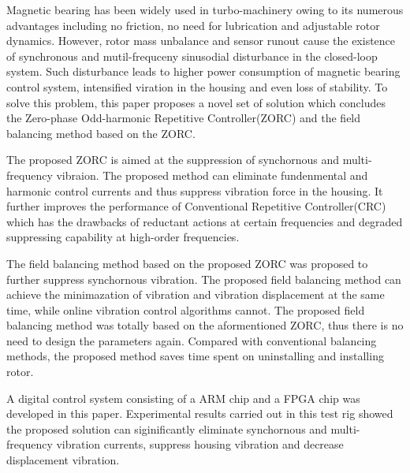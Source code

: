\begin{abstractEn}
Magnetic bearing has been widely used in turbo-machinery owing to its numerous advantages including no friction, no need for lubrication and adjustable rotor dynamics. However, rotor mass unbalance and sensor runout cause the existence of synchronous and mutil-frequceny sinusodial disturbance in the closed-loop system. Such disturbance leads to higher power consumption of magnetic bearing control system, intensified viration in the housing and even loss of stability. To solve this problem, this paper proposes a novel set of solution which concludes the Zero-phase Odd-harmonic Repetitive Controller(ZORC) and the field balancing method based on the ZORC. 

The proposed ZORC is aimed at the suppression of synchornous and multi-frequency vibraion. The proposed method can eliminate fundenmental and harmonic control currents and thus suppress vibration force in the housing. It further improves the performance of Conventional Repetitive Controller(CRC) which has the drawbacks of reductant actions at certain frequencies and degraded suppressing capability at high-order frequencies.

The field balancing method based on the proposed ZORC was proposed to further suppress synchornous vibration. The proposed field balancing method can achieve the minimazation of vibration and vibration displacement at the same time, while online vibration control algorithms cannot. The proposed field balancing method was totally based on the aformentioned ZORC, thus there is no need to design the parameters again. Compared with conventional balancing methods, the proposed method saves time spent on uninstalling and installing rotor.

A digital control system consisting of a ARM chip and a FPGA chip was developed in this paper. Experimental results carried out in this test rig showed the proposed solution can siginificantly eliminate synchornous and multi-frequency vibration currents, suppress housing vibration and decrease displacement vibration.

\end{abstractEn}



\usepackage{subfig}
\usepackage{rotating}
\usepackage[usenames,dvipsnames]{xcolor}
\usepackage{tikz}
\usepackage{pgfplots}
\pgfplotsset{compat=1.16}
\usepackage{ifthen}
\usepackage{longtable}
\usepackage{siunitx}
\usepackage{listings}
\usepackage{multirow}
\usepackage[bottom]{footmisc}
\usepackage{pifont}

